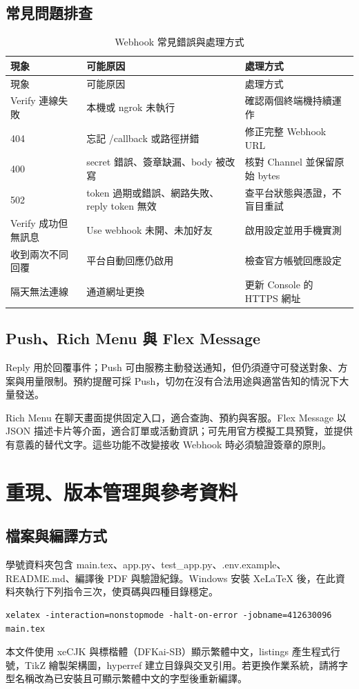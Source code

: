 \documentclass[12pt,a4paper]{report}
\begin{document}
\section{常見問題排查}
\begin{longtable}{p{33mm}p{48mm}p{50mm}}
\caption{Webhook 常見錯誤與處理方式}\label{tab:debug}\\
\toprule 現象 & 可能原因 & 處理方式\\\midrule\endfirsthead
\toprule 現象 & 可能原因 & 處理方式\\\midrule\endhead
Verify 連線失敗 & 本機或 ngrok 未執行 & 確認兩個終端機持續運作\\
404 & 忘記 /callback 或路徑拼錯 & 修正完整 Webhook URL\\
400 & secret 錯誤、簽章缺漏、body 被改寫 & 核對 Channel 並保留原始 bytes\\
502 & token 過期或錯誤、網路失敗、reply token 無效 & 查平台狀態與憑證，不盲目重試\\
Verify 成功但無訊息 & Use webhook 未開、未加好友 & 啟用設定並用手機實測\\
收到兩次不同回覆 & 平台自動回應仍啟用 & 檢查官方帳號回應設定\\
隔天無法連線 & 通道網址更換 & 更新 Console 的 HTTPS 網址\\\bottomrule
\end{longtable}
\section{Push、Rich Menu 與 Flex Message}
Reply 用於回覆事件；Push 可由服務主動發送通知，但仍須遵守可發送對象、方案與用量限制。預約提醒可採 Push，切勿在沒有合法用途與適當告知的情況下大量發送。

Rich Menu 在聊天畫面提供固定入口，適合查詢、預約與客服。Flex Message 以 JSON 描述卡片等介面，適合訂單或活動資訊；可先用官方模擬工具預覽，並提供有意義的替代文字。這些功能不改變接收 Webhook 時必須驗證簽章的原則。
\clearpage
\chapter{重現、版本管理與參考資料}
\section{檔案與編譯方式}
學號資料夾包含 main.tex、app.py、test\_app.py、.env.example、README.md、編譯後 PDF 與驗證紀錄。Windows 安裝 XeLaTeX 後，在此資料夾執行下列指令三次，使頁碼與四種目錄穩定。
\begin{lstlisting}[caption={XeLaTeX 編譯命令},label={lst:compile}]
xelatex -interaction=nonstopmode -halt-on-error -jobname=412630096 main.tex
\end{lstlisting}
本文件使用 xeCJK 與標楷體（DFKai-SB）顯示繁體中文，listings 產生程式行號，TikZ 繪製架構圖，hyperref 建立目錄與交叉引用。若更換作業系統，請將字型名稱改為已安裝且可顯示繁體中文的字型後重新編譯。
\end{document}
